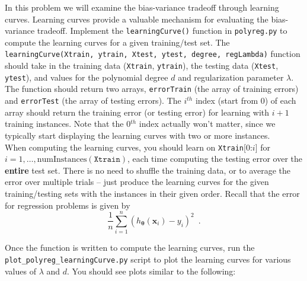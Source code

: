\documentclass{article}
\begin{document}
\begin{aprob}
     In this problem we will examine the bias-variance tradeoff through learning curves. Learning curves provide a valuable mechanism for evaluating the bias-variance tradeoff. Implement the \texttt{learningCurve()} function in \texttt{polyreg.py} to compute the learning curves for a given training/test set.  The \texttt{learningCurve(Xtrain, ytrain, Xtest, ytest, degree, regLambda)} function should take in the training data (\texttt{Xtrain}, \texttt{ytrain}), the testing data (\texttt{Xtest}, \texttt{ytest}), and values for the polynomial degree $d$ and regularization parameter $\lambda$. The function should return two arrays, \texttt{errorTrain} (the array of training errors) and \texttt{errorTest} (the array of testing errors).  The $i^{th}$ index (start from 0) of each array should return the training error (or testing error) for learning with $i +1$ training instances.  Note that the 0$^{th}$ index actually won't matter, since we typically start displaying the learning curves with two or more instances.\\
    
    When computing the learning curves, you should learn on \texttt{Xtrain}[0:$i$] for $i = 1, \ldots, \text{numInstances}(\texttt{Xtrain})$, each time computing the testing error over the {\bf entire} test set.  There is no need to shuffle the training data, or to average the error over multiple trials -- just produce the learning curves for the given training/testing sets with the instances in their given order.  Recall that the error for regression problems is given by
    \begin{equation}
        \frac{1}{n} \sum_{i=1}^n (h_{\bm{\theta}}(\mathbf{x}_i) - y_i)^2 \enspace.
    \end{equation}
    
    Once the function is written to compute the learning curves, run the \texttt{plot\_polyreg\_learningCurve.py} script to plot the learning curves for various values of $\lambda$ and $d$.  You should see plots similar to the following:
    \begin{figure}[ht!]
        \centering
        \vspace{-1em}
        \vspace{-1em}
    \end{figure}
    

\end{aprob}
\end{document}
